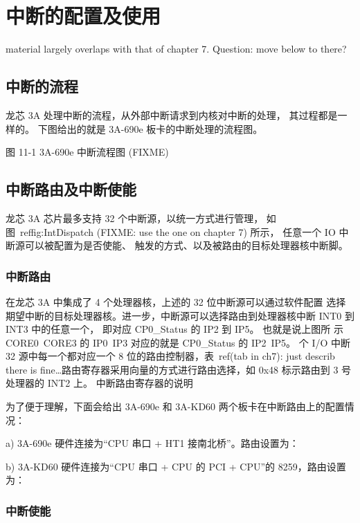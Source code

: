 \chapter{中断的配置及使用}

material largely overlaps with that of chapter 7. Question: move below to
there?

\section{中断的流程}

龙芯 3A 处理中断的流程，从外部中断请求到内核对中断的处理， 其过程都是一样的。
下图给出的就是 3A-690e 板卡的中断处理的流程图。

图 11-1 3A-690e 中断流程图 (FIXME)

\section{中断路由及中断使能}

龙芯 3A 芯片最多支持 32 个中断源，以统一方式进行管理， 如
图~ref{fig:IntDispatch} (FIXME: use the one on chapter 7) 所示， 任意一个 IO
中断源可以被配置为是否使能、 触发的方式、以及被路由的目标处理器核中断脚。

\subsection{中断路由}

在龙芯 3A 中集成了 4 个处理器核，上述的 32 位中断源可以通过软件配置
选择期望中断的目标处理器核。进一步，中断源可以选择路由到处理器核中断 INT0 到
INT3 中的任意一个， 即对应 CP0\_Status 的 IP2 到 IP5。 也就是说上图所 示
CORE0~CORE3 的 IP0~IP3 对应的就是 CP0\_Status 的 IP2~IP5。 个 I/O 中断 32
源中每一个都对应一个 8 位的路由控制器，表~ref(tab in ch7): just describ there
is fine\ldots 路由寄存器采用向量的方式进行路由选择，如 0x48 标示路由到 3
号处理器的 INT2 上。
中断路由寄存器的说明

为了便于理解，下面会给出 3A-690e 和 3A-KD60 两个板卡在中断路由上的配置情况：

a) 3A-690e 硬件连接为“CPU 串口 + HT1 接南北桥”。路由设置为：


b) 3A-KD60 硬件连接为“CPU 串口 + CPU 的 PCI + CPU”的 8259，路由设置为：


\subsection{中断使能}

